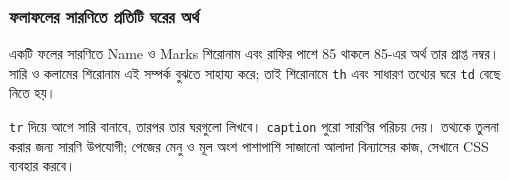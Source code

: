 \subsubsection{ফলাফলের সারণিতে প্রতিটি ঘরের অর্থ}
একটি ফলের সারণিতে Name ও Marks শিরোনাম এবং রাফির পাশে 85 থাকলে 85-এর অর্থ তার প্রাপ্ত নম্বর। সারি ও কলামের শিরোনাম এই সম্পর্ক বুঝতে সাহায্য করে; তাই শিরোনামে \texttt{th} এবং সাধারণ তথ্যের ঘরে \texttt{td} বেছে নিতে হয়।

\texttt{tr} দিয়ে আগে সারি বানাবে, তারপর তার ঘরগুলো লিখবে। \texttt{caption} পুরো সারণির পরিচয় দেয়। তথ্যকে তুলনা করার জন্য সারণি উপযোগী; পেজের মেনু ও মূল অংশ পাশাপাশি সাজানো আলাদা বিন্যাসের কাজ, সেখানে CSS ব্যবহার করবে।
